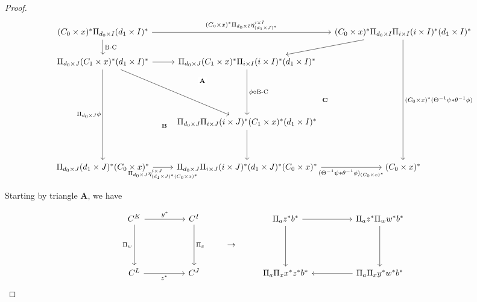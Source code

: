 \documentclass[10pt, oneside]{article}
\begin{document}
\begin{proof}
	\[\begin{tikzcd}[column sep=small]
		{(C_0 \times x)^\ast \Pi_{d_0 \times I} (d_1 \times I)^\ast} &&& {(C_0 \times x)^\ast \Pi_{d_0 \times I} \Pi_{i \times I} (i \times I)^\ast (d_1 \times I)^\ast } \\
		{\Pi_{d_0 \times J} (C_1 \times x)^\ast (d_1 \times I)^\ast} && {\Pi_{d_0 \times J} (C_1 \times x)^\ast \Pi_{i \times I} (i \times I)^\ast (d_1 \times I)^\ast} \\
		\\
		\\
		&& {\Pi_{d_0 \times J} \Pi_{i \times J} (i \times J)^\ast (C_1 \times x)^\ast (d_1 \times I)^\ast} \\
		\\
		{\Pi_{d_0 \times J} (d_1 \times J)^\ast (C_0 \times x)^\ast } && {\Pi_{d_0 \times J} \Pi_{i \times J} (i \times J)^\ast (d_1 \times J)^\ast (C_0 \times x)^\ast } & {(C_0 \times x)^\ast }
		\arrow["{\text{B-C}}", from=1-1, to=2-1]
		\arrow["{\Pi_{d_0 \times J} \phi}"', from=2-1, to=7-1]
		\arrow[""{name=0, anchor=center, inner sep=0}, "{\Pi_{d_0 \times J} \eta^{i \times J}_{(d_1 \times J)^\ast (C_0 \times x)^\ast }}"', from=7-1, to=7-3]
		\arrow["{(\Theta^{-1} \psi \ast \theta^{-1} \phi)_{(C_0 \times x)^\ast }}"', from=7-3, to=7-4]
		\arrow["{(C_0 \times x)^\ast \Pi_{d_0 \times I} \eta^{i \times I}_{(d_1 \times J)^\ast}}", from=1-1, to=1-4]
		\arrow[""{name=1, anchor=center, inner sep=0}, "{(C_0 \times x)^\ast  (\Theta^{-1} \psi \ast \theta^{-1} \phi)}", from=1-4, to=7-4]
		\arrow[from=2-1, to=2-3]
		\arrow[from=1-4, to=2-3]
		\arrow[""{name=2, anchor=center, inner sep=0}, from=2-1, to=5-3]
		\arrow[""{name=3, anchor=center, inner sep=0}, "{\phi \circ\text{B-C}}", from=2-3, to=5-3]
		\arrow[from=5-3, to=7-3]
		\arrow["{\mathbf{A}}"{description}, draw=none, from=2, to=2-3]
		\arrow["{\mathbf{B}}"', draw=none, from=2, to=0]
		\arrow["{\mathbf{C}}"', draw=none, from=3, to=1]
	\end{tikzcd}\]
	
	Starting by triangle $\mathbf{A}$, we have
	
	\[\begin{tikzcd}
		{C^K} && {C^I} && {\Pi_a z^\ast b^\ast} && {\Pi_a z^\ast \Pi_w w^\ast b^\ast} \\
		&&& \rightarrow \\
		{C^L} && {C^J} && {\Pi_a \Pi_x x^\ast z^\ast b^\ast} && {\Pi_a \Pi_x y^\ast w^\ast b^\ast}
		\arrow[from=1-5, to=3-5]
		\arrow[from=1-5, to=1-7]
		\arrow[from=1-7, to=3-7]
		\arrow[from=3-7, to=3-5]
		\arrow["{\Pi_w}"', from=1-1, to=3-1]
		\arrow["{z^\ast}"', from=3-1, to=3-3]
		\arrow["{y^\ast}", from=1-1, to=1-3]
		\arrow["{\Pi_x}", from=1-3, to=3-3]
	\end{tikzcd}\]
	

\end{proof}
\end{document}
